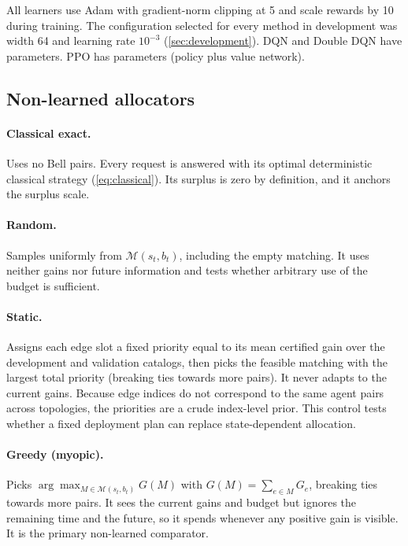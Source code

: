 \documentclass[11pt,a4paper]{article}
\newcommand{\M}{\mathcal{M}}
\begin{document}
All learners use Adam \cite{kingma2015adam} with gradient-norm clipping at 5 and scale rewards by 10 during training. The configuration selected for every method in development was width 64 and learning rate $10^{-3}$ (\cref{sec:development}). DQN and Double DQN have \paramsDQN{} parameters. PPO has \paramsPPO{} parameters (policy plus value network).

\subsection{Non-learned allocators}\label{sec:baselines}

\paragraph{Classical exact.} Uses no Bell pairs. Every request is answered with its optimal deterministic classical strategy (\cref{eq:classical}). Its surplus is zero by definition, and it anchors the surplus scale.

\paragraph{Random.} Samples uniformly from $\M(s_t,b_t)$, including the empty matching. It uses neither gains nor future information and tests whether arbitrary use of the budget is sufficient.

\paragraph{Static.} Assigns each edge slot a fixed priority equal to its mean certified gain over the development and validation catalogs, then picks the feasible matching with the largest total priority (breaking ties towards more pairs). It never adapts to the current gains. Because edge indices do not correspond to the same agent pairs across topologies, the priorities are a crude index-level prior. This control tests whether a fixed deployment plan can replace state-dependent allocation.

\paragraph{Greedy (myopic).} Picks $\arg\max_{M\in\M(s_t,b_t)}G(M)$ with $G(M)=\sum_{e\in M}G_e$, breaking ties towards more pairs. It sees the current gains and budget but ignores the remaining time and the future, so it spends whenever any positive gain is visible. It is the primary non-learned comparator.
\end{document}
